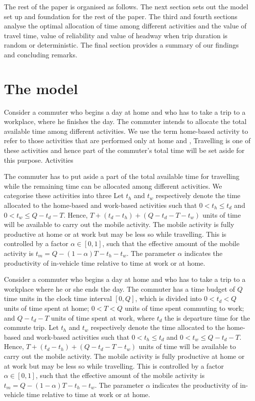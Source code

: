 \documentclass[12pt,a4paper,british]{article}
\theoremstyle{definition}
\theoremstyle{plain}
\theoremstyle{plain}
\begin{document}
The rest of the paper is organised as follows. The next section sets
out the model set up and foundation for the rest of the paper. The
third and fourth sections analyse the optimal allocation of time among
different activities and the value of travel time, value of reliability
and value of headway when trip duration is random or deterministic.
The final section provides a summary of our findings and concluding
remarks.

\section{The model}

Consider a commuter who begins a day at home and who has to take a
trip to a workplace, where he finishes the day. The commuter intends
to allocate the total available time among different activities. We
use the term home-based activity to refer to those activities that
are performed only at home and , Travelling is one of these activities
and hence part of the commuter's total time will be set aside for
this purpose. Activities

The commuter has to put aside a part of the total available time for
travelling while the remaining time can be allocated among different
activities. We categorise these activities into three Let $t_{h}$
and $t_{w}$ respectively denote the time allocated to the home-based
and work-based activities such that $0<t_{h}\leq t_{d}$ and $0<t_{w}\leq Q-t_{d}-T$.
Hence, $T+\left(t_{d}-t_{h}\right)+\left(Q-t_{d}-T-t_{w}\right)$
units of time will be available to carry out the mobile activity.
The mobile activity is fully productive at home or at work but may
be less so while travelling. This is controlled by a factor $\alpha\in\left[0,1\right]$,
such that the effective amount of the mobile activity is $t_{m}=Q-\left(1-\alpha\right)T-t_{h}-t_{w}$.
The parameter $\alpha$ indicates the productivity of in-vehicle time
relative to time at work or at home.

Consider a commuter who begins a day at home and who has to take a
trip to a workplace where he or she ends the day. The commuter has
a time budget of $Q$ time units in the clock time interval $\left[0,Q\right]$,
which is divided into $0<t_{d}<Q$ units of time spent at home; $0<T<Q$
units of time spent commuting to work; and $Q-t_{d}-T$ units of time
spent at work, where $t_{d}$ the is departure time for the commute
trip. Let $t_{h}$ and $t_{w}$ respectively denote the time allocated
to the home-based and work-based activities such that $0<t_{h}\leq t_{d}$
and $0<t_{w}\leq Q-t_{d}-T$. Hence, $T+\left(t_{d}-t_{h}\right)+\left(Q-t_{d}-T-t_{w}\right)$
units of time will be available to carry out the mobile activity.
The mobile activity is fully productive at home or at work but may
be less so while travelling. This is controlled by a factor $\alpha\in\left[0,1\right]$,
such that the effective amount of the mobile activity is $t_{m}=Q-\left(1-\alpha\right)T-t_{h}-t_{w}$.
The parameter $\alpha$ indicates the productivity of in-vehicle time
relative to time at work or at home.
\end{document}
